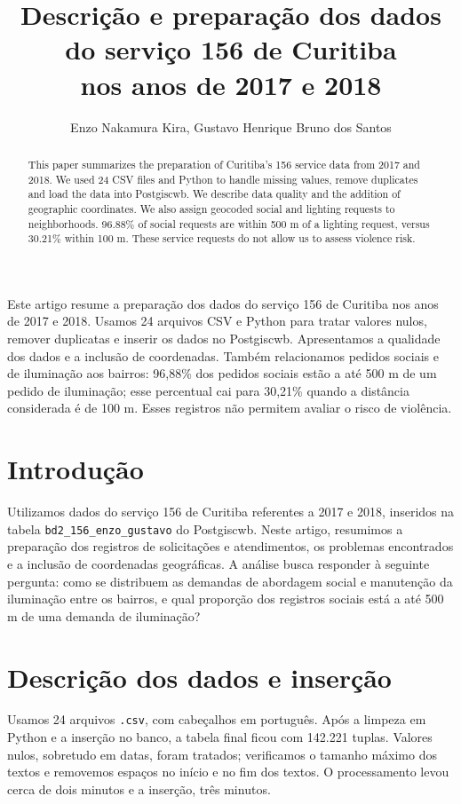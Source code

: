 \documentclass[12pt]{article}
\title{Descrição e preparação dos dados do serviço 156 de Curitiba\\
nos anos de 2017 e 2018}
\author{Enzo Nakamura Kira\inst{1}, Gustavo Henrique Bruno dos Santos\inst{1}}
\begin{document}
\maketitle
\begin{abstract}
This paper summarizes the preparation of Curitiba's 156 service data from
2017 and 2018. We used 24 CSV files and Python to handle missing values, remove
duplicates and load the data into Postgiscwb. We describe data quality and the
addition of geographic coordinates. We also assign geocoded social and lighting
requests to neighborhoods. 96.88\% of social requests are within
500 m of a lighting request, versus 30.21\% within 100 m. These service
requests do not allow us to assess violence risk.
\end{abstract}
\begin{resumo}
Este artigo resume a preparação dos dados do serviço 156 de Curitiba nos anos
de 2017 e 2018. Usamos 24 arquivos CSV e Python para tratar valores nulos,
remover duplicatas e inserir os dados no Postgiscwb. Apresentamos a qualidade dos
dados e a inclusão de coordenadas. Também relacionamos pedidos sociais e de
iluminação aos bairros: 96,88\% dos pedidos sociais estão a até 500 m de um
pedido de iluminação; esse percentual cai para 30,21\% quando a distância
considerada é de 100 m. Esses registros não permitem avaliar o risco de violência.
\end{resumo}

\section{Introdução}
Utilizamos dados do serviço 156 de Curitiba referentes a 2017 e 2018, inseridos
na tabela \texttt{bd2\_156\_enzo\_gustavo} do Postgiscwb. Neste artigo, resumimos
a preparação dos registros de solicitações e atendimentos, os problemas
encontrados e a inclusão de coordenadas geográficas. A análise busca responder
à seguinte pergunta: como se distribuem as demandas de abordagem social e
manutenção da iluminação entre os bairros, e qual proporção dos registros sociais
está a até 500 m de uma demanda de iluminação?

\section{Descrição dos dados e inserção}
Usamos 24 arquivos \texttt{.csv}, com cabeçalhos em português. Após a limpeza
em Python e a inserção no banco, a tabela final ficou com 142.221 tuplas.
Valores nulos, sobretudo em datas, foram tratados; verificamos o tamanho máximo
dos textos e removemos espaços no início e no fim dos textos. O processamento levou cerca
de dois minutos e a inserção, três minutos.
\end{document}
